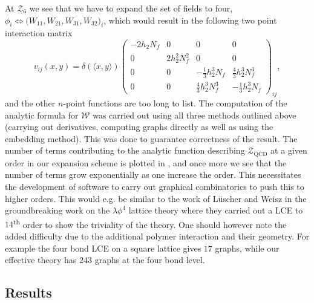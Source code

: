 %
At $\mathcal{Z}_6$ we see that we have to expand the set of fields to four,
$\phi_i \Leftrightarrow \big(W_{11}, W_{21}, W_{31}, W_{32}\big)_i$,
which would result in the following two point interaction matrix
%
\begin{equation}
  v_{ij}(x,y) = \delta(\langle x,y \rangle)
    \begin{pmatrix}
      -2 h_2 N_f & 0 & 0 & 0\\
      0 & 2 h_2^2 N_f^2 & 0 & 0\\
      0 & 0 & -\textstyle\frac{1}{3} h_2^3 N_f & \textstyle\frac{4}{3} h_2^3 N_f^3\\
      0 & 0 & \textstyle\frac{4}{3} h_2^3 N_f^3 & -\textstyle\frac{1}{3} h_2^3 N_f
    \end{pmatrix}_{ij},
\end{equation}
%
and the other $n$-point functions are too long to list. The computation of the
analytic formula for $\mathcal{W}$ was carried out using all three methods
outlined above (carrying out derivatives, computing graphs directly as well as
using the embedding method). This was done to guarantee correctness of the
result. The number of terms contributing to the analytic function describing
$\mathcal{Z}_{\mathrm{QCD}}$ at a given order in our expansion scheme is plotted
in , and once more we see that the number of terms
grow exponentially as one increase the order. This necessitates the development
of software to carry out graphical combinatorics to push this to higher orders.
This would e.g. be similar to the work of L\"{u}scher and Weisz in the
groundbreaking work on the $\lambda \phi^4$ lattice theory \citep{Luscher:1988gk,Luscher:1988uq}
where they carried out a LCE to $14$\textsuperscript{th} order to show the
triviality of the theory. One should however note the added difficulty due to
the additional polymer interaction and their geometry. For example the four bond
LCE on a square lattice gives $17$ graphs, while our effective theory has $243$
graphs at the four bond level.

\subsection{Results} \label{sec:cluster_results}

